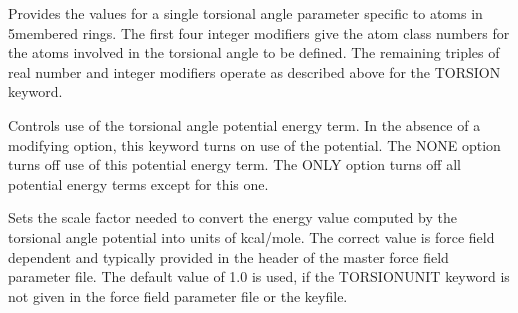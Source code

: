 \documentclass[letterpaper,11pt,english]{sphinxmanual}
\begin{document}
\ignorespaces {}\label{\detokenize{text/keywords:key-torsion5}}\begin{description}
\sphinxAtStartPar
Provides the values for a single torsional angle parameter specific to atoms in 5\sphinxhyphen{}membered rings. The first four integer modifiers give the atom class numbers for the atoms involved in the torsional angle to be defined. The remaining triples of real number and integer modifiers operate as described above for the TORSION keyword.

\end{description}

\ignorespaces {}\label{\detokenize{text/keywords:key-torsionterm}}\begin{description}
\sphinxAtStartPar
Controls use of the torsional angle potential energy term. In the absence of a modifying option, this keyword turns on use of the potential. The NONE option turns off use of this potential energy term. The ONLY option turns off all potential energy terms except for this one.

\end{description}

\ignorespaces {}\label{\detokenize{text/keywords:key-torsionunit}}\begin{description}
\sphinxAtStartPar
Sets the scale factor needed to convert the energy value computed by the torsional angle potential into units of kcal/mole. The correct value is force field dependent and typically provided in the header of the master force field parameter file. The default value of 1.0 is used, if the TORSIONUNIT keyword is not given in the force field parameter file or the keyfile.

\end{description}
\end{document}
